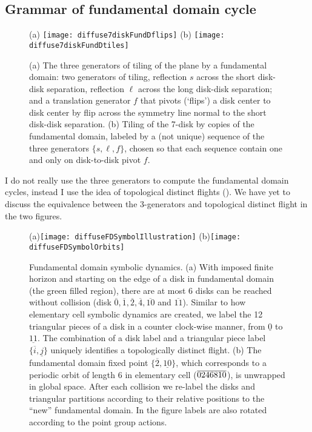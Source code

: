 \documentclass[aps,pre,
                showpacs,
                twocolumn,
                groupedaddress,
                floatfix]{revtex4-1}
\begin{document}
\subsection{Grammar of fundamental domain cycle}

\begin{figure}[htbp]
  \begin{center}
    (a) \texttt{[image: diffuse7diskFundDflips]}
    (b) \texttt{[image: diffuse7diskFundDtiles]}
  \end{center}
  \caption{\label{fig-7diskFundDflips}
  (a) The three generators of tiling of the  plane by a fundamental
  domain: two generators of  tiling, reflection  $s$ across the
  short disk-disk separation, reflection $\ell$ across the long
  disk-disk separation; and a translation generator $f$ that pivots
  (`flips') a  disk center to disk center by flip across the symmetry
  line normal to the short disk-disk separation.
  (b) Tiling of the 7-disk by copies of the fundamental domain, labeled
  by a (not unique) sequence of the three generators  $\{s,\ell,f\}$,
  chosen so that each sequence contain one and only on  disk-to-disk
  pivot $f$.
  }
\end{figure}
    {I do not really use the three generators to compute the fundamental
    domain cycles, instead I use the idea of topological distinct flights
    (). We have yet to discuss the equivalence
    between the 3-generators and topological distinct flight in the two
    figures. }

\begin{figure}[htbp]
  (a)\texttt{[image: diffuseFDSymbolIllustration]}
  (b)\texttt{[image: diffuseFDSymbolOrbits]}
  \caption{\label{fig-fdflights}
  Fundamental domain symbolic dynamics.
  (a) With  imposed finite horizon and starting on the edge of a disk in
  fundamental  domain (the green filled region), there are at most 6
  disks can be reached  without collision (disk
  $\overline{0},\overline{1},\overline{2},\overline{4},\overline{10}$ and
  $\overline{11}$). Similar to how elementary cell symbolic dynamics are
  created, we label the 12 triangular pieces of a disk in a counter
  clock-wise  manner, from $\underline{0}$ to $\underline{11}$. The
  combination of a disk  label and a triangular piece label
  $\{\overline{i},\underline{j}\}$ uniquely  identifies a topologically
  distinct flight.
  (b) The fundamental domain fixed point
  $\{\overline{2},\underline{10}\}$, which corresponds to a periodic
  orbit of length 6 in elementary cell (${\overline{0246810}}$), is unwrapped
  in   global space. After each collision we re-label the disks and
  triangular   partitions according to their relative positions to the
  ``new'' fundamental   domain. In the figure labels are also rotated
  according to the point   group actions.
  }
\end{figure}
\end{document}
